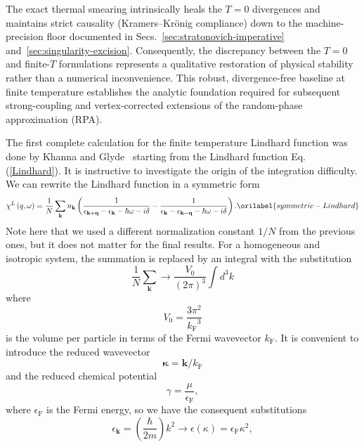 \documentclass[aps,showkeys,noshowpacs,superscriptaddress,pre,preprint]{revtex4-2}
\let\label\orilabel
\begin{document}
The exact thermal smearing intrinsically heals the $T=0$ divergences and maintains strict causality (Kramers--Kr\"onig compliance) down to the machine-precision floor documented in Secs.~\ref{sec:stratonovich-imperative} and~\ref{sec:singularity-excision}.
Consequently, the discrepancy between the $T=0$ and finite-$T$ formulations represents a qualitative restoration of physical stability rather than a numerical inconvenience.
This robust, divergence-free baseline at finite temperature establishes the analytic foundation required for subsequent strong-coupling and vertex-corrected extensions of the random-phase approximation (RPA).

The first complete calculation for the finite temperature Lindhard function
was done by Khanna and Glyde~\cite{Khanna-Glyde1976}
starting from the Lindhard function Eq. (\ref{Lindhard}).
It is instructive to investigate the origin of the integration difficulty.
We can rewrite the Lindhard function in a symmetric form
\begin{equation}
\chi^L \left( q, \omega \right) = \frac{1}{N} \sum_{\mathbf{k}} n_\mathbf{k} \left(
\frac{1}{\epsilon_{\mathbf{k} + \mathbf{q}} - \epsilon_{\mathbf{k}} - \hbar\omega - i \delta} 
- \frac{1}{\epsilon_{\mathbf{k}} - \epsilon_{\mathbf{k} - \mathbf{q}} - \hbar\omega - i \delta}
\right) .
\label{symmetric-Lindhard}
\end{equation}
Note here that we used a different normalization constant $1/N$ from the previous ones, 
but it does not matter for the final results.
For a homogeneous and isotropic system, the summation is replaced by an integral with the substitution
\begin{equation*}
\frac{1}{N} \sum_\mathbf{k} \rightarrow \frac{V_0}{\left( 2 \pi \right)^3} \int d^3 k
\end{equation*}
where
\begin{equation*} 
V_0 = \frac{3 \pi^2}{ {k_\mathrm{F}}^{3} }
\end{equation*}
is the volume per particle in terms of the Fermi wavevector $k_\mathrm{F}$.
It is convenient to introduce the reduced wavevector
\begin{equation*}
\boldsymbol{\kappa} = \mathbf{k}/ k_\mathrm{F}
\end{equation*}
and the reduced chemical potential
\begin{equation*}
\gamma = \frac{\mu}{\epsilon_\mathrm{F}} ,
\end{equation*}
where $\epsilon_\mathrm{F}$ is the Fermi energy,
so we have the consequent substitutions
\begin{equation*}
\epsilon_\mathbf{k} = \left( \frac{\hbar}{2m} \right) k^2 \rightarrow {\epsilon ( \kappa )} = \epsilon_\mathrm{F} \kappa^2 ,
\end{equation*}
\end{document}
